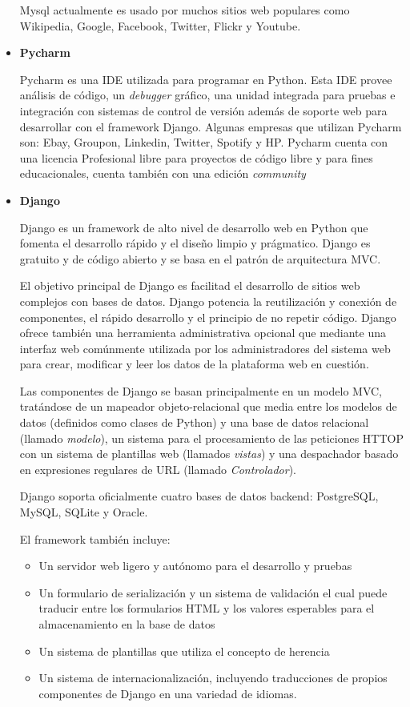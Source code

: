 \begin{itemize}
		Mysql actualmente es usado por muchos sitios web populares como Wikipedia, Google, Facebook, Twitter, Flickr y Youtube. 
		
	\item \textbf{Pycharm}
	
		Pycharm \cite{pycharmWeb} es una IDE utilizada para programar en Python. Esta IDE provee análisis de código, un \emph{debugger} gráfico, una unidad integrada para pruebas e integración con sistemas de control de versión además de soporte web para desarrollar con el framework Django. Algunas empresas que utilizan Pycharm son: Ebay, Groupon, Linkedin, Twitter, Spotify y HP. Pycharm cuenta con una licencia Profesional libre para proyectos de código libre y para fines educacionales, cuenta también con una edición \emph{community}

	\item \textbf{Django}
	
	Django \cite{djangoWeb} es un framework de alto nivel de desarrollo web en Python que fomenta el desarrollo rápido y el diseño limpio y prágmatico. Django es gratuito y de código abierto y se basa en el patrón de arquitectura MVC.
	
	El objetivo principal de Django es facilitad el desarrollo de sitios web complejos con bases de datos. Django potencia la reutilización y conexión de componentes, el rápido desarrollo y el principio de no repetir código. Django ofrece también una herramienta administrativa opcional que mediante una interfaz web comúnmente utilizada por los administradores del sistema web para crear, modificar y leer los datos de la plataforma web en cuestión. 
	
	Las componentes de Django se basan principalmente en un modelo MVC, tratándose de un mapeador objeto-relacional que media entre los modelos de datos (definidos como clases de Python) y una base de datos relacional (llamado \emph{modelo}), un sistema para el procesamiento de las peticiones HTTOP con un sistema de plantillas web (llamados \emph{vistas}) y una despachador basado en expresiones regulares de URL (llamado \emph{Controlador}).
	
	Django soporta oficialmente cuatro bases de datos backend: PostgreSQL, MySQL, SQLite y Oracle.
	
	El framework también incluye:
	
	\begin{itemize}
		\item Un servidor web ligero y autónomo para el desarrollo y pruebas
		\item Un formulario de serialización y un sistema de validación el cual puede traducir entre los formularios HTML y los valores esperables para el almacenamiento en la base de datos
		\item Un sistema de plantillas que utiliza el concepto de herencia
		\item Un sistema de internacionalización, incluyendo traducciones de propios componentes de Django en una variedad de idiomas.
	\end{itemize}
	

\end{itemize}
